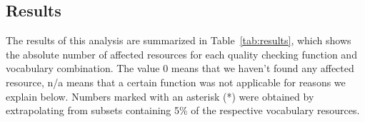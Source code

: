 \begin{table}
\begin{center}
{}
\end{center}
\end{table}

\subsection{Results}

The results of this analysis are summarized in Table~\ref{tab:results}, which shows the absolute number of affected resources for each quality checking function and vocabulary combination. The value 0 means that we haven't found any affected resource, n/a means that a certain function was not applicable for reasons we explain below. Numbers marked with an asterisk (*) were obtained by extrapolating from subsets containing 5\% of the respective vocabulary resources.

